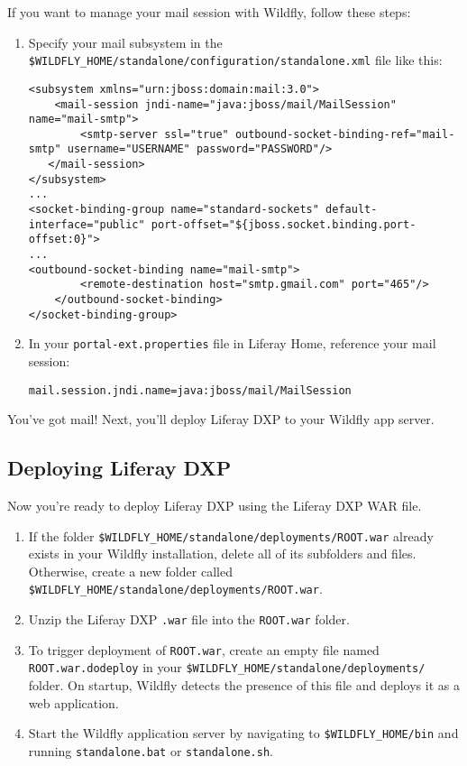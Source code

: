 If you want to manage your mail session with Wildfly, follow these
steps:

\begin{enumerate}
\def\labelenumi{\arabic{enumi}.}
\item
  Specify your mail subsystem in the
  \texttt{\$WILDFLY\_HOME/standalone/configuration/standalone.xml} file
  like this:

\begin{verbatim}
<subsystem xmlns="urn:jboss:domain:mail:3.0">
    <mail-session jndi-name="java:jboss/mail/MailSession" name="mail-smtp">
        <smtp-server ssl="true" outbound-socket-binding-ref="mail-smtp" username="USERNAME" password="PASSWORD"/>
   </mail-session>
</subsystem>
...
<socket-binding-group name="standard-sockets" default-interface="public" port-offset="${jboss.socket.binding.port-offset:0}">
...
<outbound-socket-binding name="mail-smtp">
        <remote-destination host="smtp.gmail.com" port="465"/>
    </outbound-socket-binding>
</socket-binding-group>
\end{verbatim}
\item
  In your \texttt{portal-ext.properties} file in Liferay Home, reference
  your mail session:

\begin{verbatim}
mail.session.jndi.name=java:jboss/mail/MailSession
\end{verbatim}
\end{enumerate}

You've got mail! Next, you'll deploy Liferay DXP to your Wildfly app
server.

\subsection{Deploying Liferay DXP}\label{deploying-liferay-dxp-1}

Now you're ready to deploy Liferay DXP using the Liferay DXP WAR file.

\begin{enumerate}
\def\labelenumi{\arabic{enumi}.}
\item
  If the folder \texttt{\$WILDFLY\_HOME/standalone/deployments/ROOT.war}
  already exists in your Wildfly installation, delete all of its
  subfolders and files. Otherwise, create a new folder called
  \texttt{\$WILDFLY\_HOME/standalone/deployments/ROOT.war}.
\item
  Unzip the Liferay DXP \texttt{.war} file into the \texttt{ROOT.war}
  folder.
\item
  To trigger deployment of \texttt{ROOT.war}, create an empty file named
  \texttt{ROOT.war.dodeploy} in your
  \texttt{\$WILDFLY\_HOME/standalone/deployments/} folder. On startup,
  Wildfly detects the presence of this file and deploys it as a web
  application.
\item
  Start the Wildfly application server by navigating to
  \texttt{\$WILDFLY\_HOME/bin} and running \texttt{standalone.bat} or
  \texttt{standalone.sh}.
\end{enumerate}

